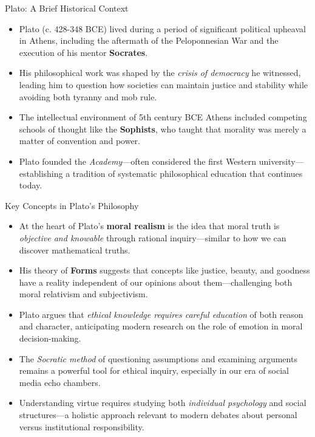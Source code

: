 \documentclass[aspectratio=169]{beamer}
\begin{document}
\begin{frame}{Plato: A Brief Historical Context}
\begin{itemize}
\item Plato (c. 428-348 BCE) lived during a period of significant political upheaval in Athens, including the aftermath of the Peloponnesian War and the execution of his mentor \textbf{Socrates}.
\item His philosophical work was shaped by the \emph{crisis of democracy} he witnessed, leading him to question how societies can maintain justice and stability while avoiding both tyranny and mob rule.
\item The intellectual environment of 5th century BCE Athens included competing schools of thought like the \textbf{Sophists}, who taught that morality was merely a matter of convention and power.
\item Plato founded the \emph{Academy}—often considered the first Western university—establishing a tradition of systematic philosophical education that continues today.
\end{itemize}
\end{frame}

\begin{frame}{Key Concepts in Plato's Philosophy}
\begin{itemize}
\item At the heart of Plato's \textbf{moral realism} is the idea that moral truth is \emph{objective and knowable} through rational inquiry—similar to how we can discover mathematical truths.
\item His theory of \textbf{Forms} suggests that concepts like justice, beauty, and goodness have a reality independent of our opinions about them—challenging both moral relativism and subjectivism.
\item Plato argues that \emph{ethical knowledge requires careful education} of both reason and character, anticipating modern research on the role of emotion in moral decision-making.
\item The \emph{Socratic method} of questioning assumptions and examining arguments remains a powerful tool for ethical inquiry, especially in our era of social media echo chambers.
\item Understanding virtue requires studying both \emph{individual psychology} and social structures—a holistic approach relevant to modern debates about personal versus institutional responsibility.
\end{itemize}
\end{frame}
\end{document}
